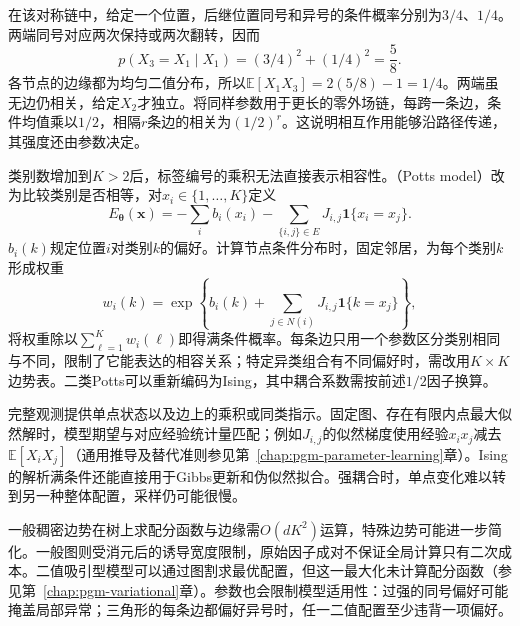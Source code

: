 在该对称链中，给定一个位置，后继位置同号和异号的条件概率分别为$3/4$、$1/4$。两端同号对应两次保持或两次翻转，因而
\[
  p(X_3=X_1\mid X_1)
    =(3/4)^2+(1/4)^2=\frac58.
\]
各节点的边缘都为均匀二值分布，所以$\mathbb{E}[X_1X_3]=2(5/8)-1=1/4$。两端虽无边仍相关，给定$X_2$才独立。将同样参数用于更长的零外场链，每跨一条边，条件均值乘以$1/2$，相隔$r$条边的相关为$(1/2)^r$。这说明相互作用能够沿路径传递，其强度还由参数决定。

类别数增加到$K>2$后，标签编号的乘积无法直接表示相容性。（Potts model）改为比较类别是否相等，对$x_i\in\{1,\ldots,K\}$定义
\begin{equation}
  E_{\bm{\theta}}(\bm{x})
   =-\sum_i b_i(x_i)
    -\sum_{\{i,j\}\in E}J_{i,j}\mathbf{1}\{x_i=x_j\}.
  \label{eq:pgm-energy-models-potts}
\end{equation}
$b_i(k)$规定位置$i$对类别$k$的偏好。计算节点条件分布时，固定邻居，为每个类别$k$形成权重
\[
  w_i(k)=\exp\left\{
    b_i(k)+\sum_{j\in N(i)}J_{i,j}\mathbf{1}\{k=x_j\}
  \right\},
\]
将权重除以$\sum_{\ell=1}^K w_i(\ell)$即得满条件概率。每条边只用一个参数区分类别相同与不同，限制了它能表达的相容关系；特定异类组合有不同偏好时，需改用$K\times K$边势表。二类Potts可以重新编码为Ising，其中耦合系数需按前述$1/2$因子换算。

完整观测提供单点状态以及边上的乘积或同类指示。固定图、存在有限内点最大似然解时，模型期望与对应经验统计量匹配；例如$J_{i,j}$的似然梯度使用经验$x_ix_j$减去$\mathbb{E}[X_iX_j]$（通用推导及替代准则参见第~\ref{chap:pgm-parameter-learning}章）。Ising的解析满条件还能直接用于Gibbs更新和伪似然拟合。强耦合时，单点变化难以转到另一种整体配置，采样仍可能很慢。

一般稠密边势在树上求配分函数与边缘需$O(dK^2)$运算，特殊边势可能进一步简化。一般图则受消元后的诱导宽度限制，原始因子成对不保证全局计算只有二次成本。二值吸引型模型可以通过图割求最优配置，但这一最大化未计算配分函数（参见第~\ref{chap:pgm-variational}章）。参数也会限制模型适用性：过强的同号偏好可能掩盖局部异常；三角形的每条边都偏好异号时，任一二值配置至少违背一项偏好。

